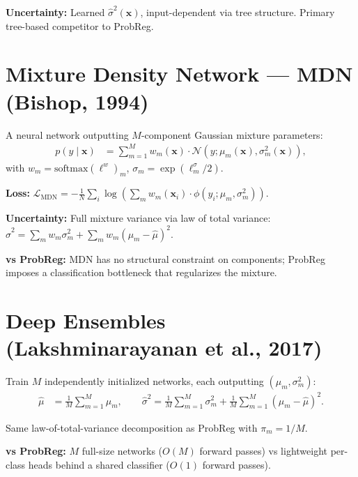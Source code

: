 \documentclass[11pt,a4paper]{article}
\theoremstyle{definition}
\newcommand{\bx}{\mathbf{x}}
\newcommand{\softmax}{\mathrm{softmax}}
\begin{document}
\textbf{Uncertainty:} Learned $\hat{\sigma}^2(\bx)$, input-dependent via
tree structure. Primary tree-based competitor to ProbReg.

\section{Mixture Density Network --- MDN (Bishop, 1994)}

A neural network outputting $M$-component Gaussian mixture parameters:
\begin{align}
  p(y \mid \bx) &= \sum_{m=1}^{M} w_m(\bx) \cdot \mathcal{N}(y; \mu_m(\bx), \sigma_m^2(\bx)),
\end{align}
with $w_m = \softmax(\ell^w)_m$, $\sigma_m = \exp(\ell^\sigma_m / 2)$.

\textbf{Loss:}
$\mathcal{L}_{\mathrm{MDN}} = -\frac{1}{N}\sum_{i} \log\left(\sum_{m} w_m(\bx_i) \cdot \phi(y_i; \mu_m, \sigma_m^2)\right)$.

\textbf{Uncertainty:} Full mixture variance via law of total variance:
$\hat{\sigma}^2 = \sum_m w_m \sigma_m^2 + \sum_m w_m(\mu_m - \hat{\mu})^2$.

\textbf{vs ProbReg:} MDN has no structural constraint on components;
ProbReg imposes a classification bottleneck that regularizes the mixture.

\section{Deep Ensembles (Lakshminarayanan et al., 2017)}

Train $M$ independently initialized networks, each outputting $(\mu_m, \sigma_m^2)$:
\begin{align}
  \hat{\mu} &= \frac{1}{M}\sum_{m=1}^M \mu_m, \qquad
  \hat{\sigma}^2 = \frac{1}{M}\sum_{m=1}^M \sigma_m^2 + \frac{1}{M}\sum_{m=1}^M (\mu_m - \hat{\mu})^2.
\end{align}

Same law-of-total-variance decomposition as ProbReg with $\pi_m = 1/M$.

\textbf{vs ProbReg:} $M$ full-size networks ($O(M)$ forward passes) vs
lightweight per-class heads behind a shared classifier ($O(1)$ forward passes).
\end{document}
